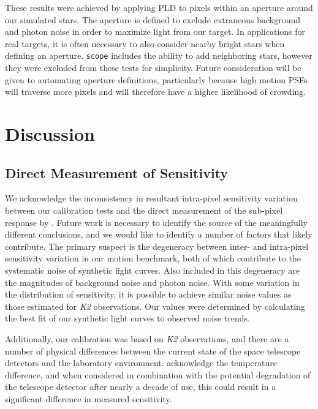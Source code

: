 \documentclass[12pt,preprint]{aastex}
\begin{document}
These results were achieved by applying PLD to pixels within an aperture around our simulated stars. The aperture is defined to exclude extraneous background and photon noise in order to maximize light from our target. In applications for real targets, it is often necessary to also consider nearby bright stars when defining an aperture. \texttt{scope} includes the ability to add neighboring stars, however they were excluded from these tests for simplicity. Future consideration will be given to automating aperture definitions, particularly because high motion PSFs will traverse more pixels and will therefore have a higher likelihood of crowding.

\section{Discussion}

\subsection{Direct Measurement of Sensitivity}

We acknowledge the inconsistency in resultant intra-pixel sensitivity variation between our calibration tests and the direct measurement of the sub-pixel response by \cite{2018arXiv180607430V}. Future work is necessary to identify the source of the meaningfully different conclusions, and we would like to identify a number of factors that likely contribute. The primary suspect is the degeneracy between inter- and intra-pixel sensitivity variation in our motion benchmark, both of which contribute to the systematic noise of synthetic light curves. Also included in this degeneracy are the magnitudes of background noise and photon noise. With some variation in the distribution of sensitivity, it is possible to achieve similar noise values as those estimated for \textit{K2} observations. Our values were determined by calculating the best fit of our synthetic light curves to observed noise trends.

Additionally, our calibration was based on \textit{K2} observations, and there are a number of physical differences between the current state of the space telescope detectors and the laboratory environment. \cite{2018arXiv180607430V} acknowledge the temperature difference, and when considered in combination with the potential degradation of the telescope detector after nearly a decade of use, this could result in a significant difference in measured sensitivity.
\end{document}
